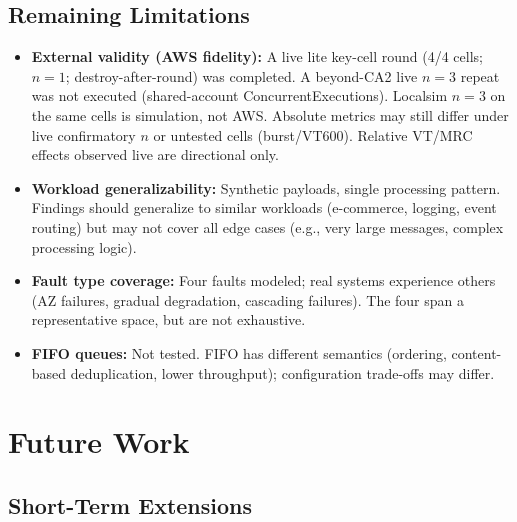 \subsection{Remaining Limitations}

\begin{itemize}
    \item \textbf{External validity (AWS fidelity):} A live lite key-cell round (4/4 cells; $n{=}1$; destroy-after-round) was completed. A beyond-CA2 live $n{=}3$ repeat was not executed (shared-account ConcurrentExecutions). Localsim $n{=}3$ on the same cells is simulation, not AWS. Absolute metrics may still differ under live confirmatory $n$ or untested cells (burst/VT600). Relative VT/MRC effects observed live are directional only.
    
    \item \textbf{Workload generalizability:} Synthetic payloads, single processing pattern. Findings should generalize to similar workloads (e-commerce, logging, event routing) but may not cover all edge cases (e.g., very large messages, complex processing logic).
    
    \item \textbf{Fault type coverage:} Four faults modeled; real systems experience others (AZ failures, gradual degradation, cascading failures). The four span a representative space, but are not exhaustive.
    
    \item \textbf{FIFO queues:} Not tested. FIFO has different semantics (ordering, content-based deduplication, lower throughput); configuration trade-offs may differ.
\end{itemize}

\section{Future Work}

\subsection{Short-Term Extensions}

